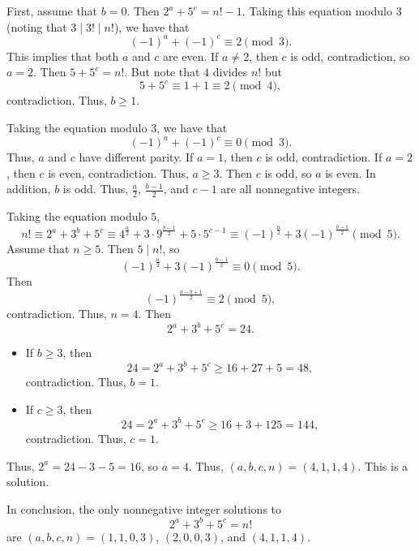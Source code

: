 First, assume that $b=0$. Then $2^a+5^c=n!-1$. Taking this equation modulo $3$ (noting that $3\mid3!\mid n!$), we have that \[\left(-1\right)^a+\left(-1\right)^c\equiv2\pmod3.\] This implies that both $a$ and $c$ are even. If $a\neq2$, then $c$ is odd, contradiction, so $a=2$. Then $5+5^c=n!$. But note that $4$ divides $n!$ but \[5+5^c\equiv1+1\equiv2\pmod4,\] contradiction. Thus, $b\geq1$.

Taking the equation modulo $3$, we have that \[\left(-1\right)^a+\left(-1\right)^c\equiv0\pmod3.\] Thus, $a$ and $c$ have different parity. If $a=1$, then $c$ is odd, contradiction. If $a=2$, then $c$ is even, contradiction. Thus, $a\geq3$. Then $c$ is odd, so $a$ is even. In addition, $b$ is odd. Thus, $\frac{a}{2}$, $\frac{b-1}{2}$, and $c-1$ are all nonnegative integers.

Taking the equation modulo $5$, \[n!\equiv2^a+3^b+5^c\equiv4^{\frac{a}{2}}+3\cdot9^{\frac{b-1}{2}}+5\cdot5^{c-1}\equiv\left(-1\right)^{\frac{a}{2}}+3\left(-1\right)^{\frac{b-1}{2}}\pmod5.\] Assume that $n\geq5$. Then $5\mid n!$, so \[\left(-1\right)^{\frac{a}{2}}+3\left(-1\right)^{\frac{b-1}{2}}\equiv0\pmod5.\] Then \[\left(-1\right)^{\frac{a-b+1}{2}}\equiv2\pmod5,\] contradiction. Thus, $n=4$. Then \[2^a+3^b+5^c=24.\]

\begin{itemize}
	
	\item If $b\geq3$, then \[24=2^a+3^b+5^c\geq16+27+5=48,\] contradiction. Thus, $b=1$.
	
	\item If $c\geq3$, then \[24=2^a+3^b+5^c\geq16+3+125=144,\] contradiction. Thus, $c=1$.
	
\end{itemize}

Thus, $2^a=24-3-5=16$, so $a=4$. Thus, $\left(a,b,c,n\right)=\left(4,1,1,4\right)$. This is a solution.

In conclusion, the only nonnegative integer solutions to \[2^a+3^b+5^c=n!\] are $\left(a,b,c,n\right)=\left(1,1,0,3\right)$, $\left(2,0,0,3\right)$, and $\left(4,1,1,4\right)$.